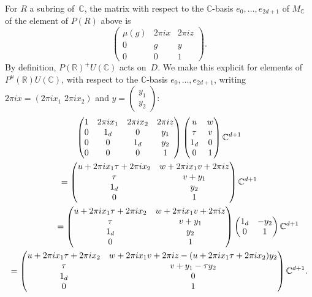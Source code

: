 \documentclass[JEP,XML,SOM,Unicode,NoFloatCountersInSection]{cedram}
\theoremstyle{plain}
\theoremstyle{definition}
\numberwithin{equation}{subsection}
\renewcommand{\C}{\mathbb C}
\newcommand{\R}{\mathbb R}
\begin{document}
For $R$ a subring of~$\C$, the matrix with respect to the $\C$-basis
$e_0,\ldots,e_{2d+1}$ of $M_\C$ of the element of $P(R)$ above is
\begin{equation}
\label{eq:P_element}
\begin{pmatrix}
\mu(g) & 2\pi i x & 2\pi iz\\
0 & g & y\\
0 & 0 & 1
\end{pmatrix}.
\end{equation}
By definition, $P(\R)^+U(\C)$ acts on~$D$. We make this explicit for
elements of $P^u(\R)U(\C)$, with respect to the $\C$-basis
$e_0,\ldots,e_{2d+1}$, writing $2\pi ix= (2\pi ix_1\,\, 2\pi ix_2)$ and
$y=(\substack{y_1\\ y_2})$:
\begin{multline}\label{eq:P-action}
\begin{pmatrix}
1 & 2\pi ix_1 & 2\pi ix_2 & 2\pi iz\\
0 & 1_d & 0 & y_1\\
0 & 0 & 1_d & y_2\\
0 & 0 & 0 & 1
\end{pmatrix}
\begin{pmatrix}
u & w\\ \tau & v \\ 1_d & 0\\ 0 & 1
\end{pmatrix}
\C^{d+1} \\ =
\begin{pmatrix}
u+2\pi ix_1\tau + 2\pi ix_2& w+2\pi ix_1v+2\pi iz\\
\tau & v + y_1\\ 1_d & y_2\\ 0 & 1
\end{pmatrix}
\C^{d+1} \\ \shoveright{=
\begin{pmatrix}
u+2\pi ix_1\tau + 2\pi ix_2& w+2\pi ix_1v+2\pi iz\\
\tau & v + y_1\\ 1_d & y_2\\ 0 & 1
\end{pmatrix}
\begin{pmatrix}
1_d & -y_2\\ 0 & 1
\end{pmatrix}
\C^{d+1}} \\ =
\begin{pmatrix}
u+2\pi ix_1\tau + 2\pi ix_2& w+2\pi ix_1v+2\pi iz-(u+2\pi ix_1\tau + 2\pi ix_2)y_2\\
\tau & v + y_1 -\tau y_2\\
1_d & 0
\\ 0 & 1
\end{pmatrix}
\C^{d+1}.
\end{multline}
\end{document}
